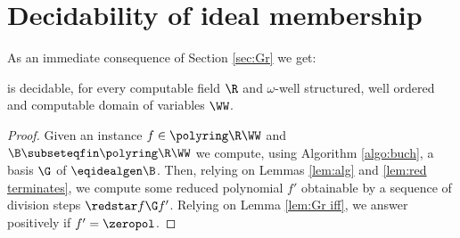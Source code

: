 %
%


\section{Decidability of ideal membership} \label{sec:decid}
%



As an immediate consequence of Section \ref{sec:Gr} we get:
%
\begin{theorem} \label{thm:ideal memb decid}
 is decidable,
for every computable field  $\R$ and $\omega$-well structured, well ordered and computable domain of variables $\WW$.
\end{theorem}
%
\begin{proof}
Given an instance $f\in\polyring\R\WW$ and $\B\subseteqfin\polyring\R\WW$ we compute,
using Algorithm \ref{algo:buch}, a \Gr basis $\G$ of $\eqidealgen\B$.
Then, relying on Lemmas \ref{lem:alg} and \ref{lem:red terminates},  
we compute some reduced polynomial $f'$ obtainable by a sequence of division steps $\redstar f \G f'$.
Relying on Lemma \ref{lem:Gr iff}, we
answer positively if $f'=\zeropol$.
\end{proof}



